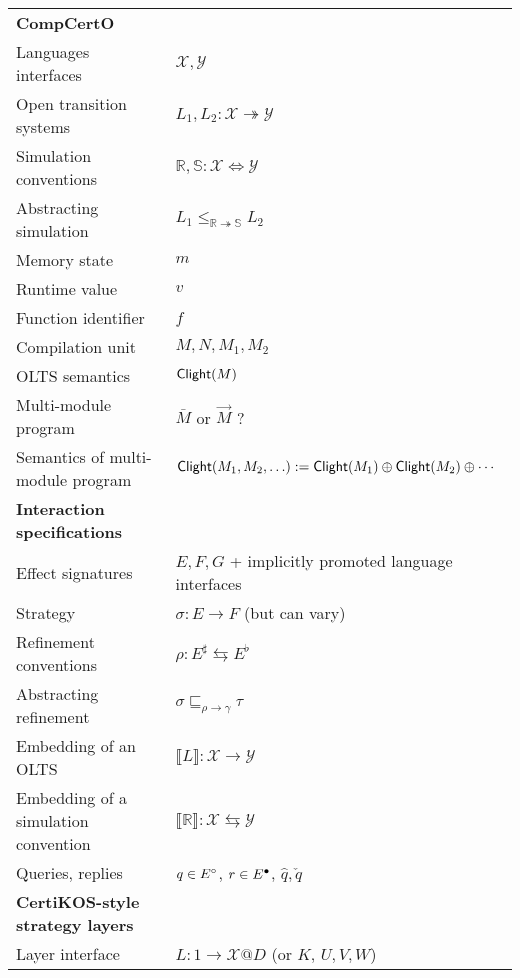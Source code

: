\documentclass[acmsmall,review,anonymous]{acmart}\settopmatter{printfolios=true,printccs=false,printacmref=false}
\begin{document}
\begin{table} %
  \begin{tabular}{ll}
    \hline
    \textbf{CompCertO} \\
    Languages interfaces & $\mathcal{X, Y}$ \\
    Open transition systems &
      $L_1, L_2 : \mathcal{X} \twoheadrightarrow \mathcal{Y}$ \\
    Simulation conventions &
      $\mathbb{R}, \mathbb{S} : \mathcal{X} \Leftrightarrow \mathcal{Y}$ \\
    Abstracting simulation &
      $L_1 \le_{\mathbb{R} \twoheadrightarrow \mathbb{S}} L_2$ \\
    \hline
    Memory state & $m$ \\
    Runtime value & $v$ \\
    Function identifier & $f$ \\
    \hline
    Compilation unit & $M, N, M_1, M_2$ \\
    OLTS semantics & $ \mathsf{Clight} (M)$ \\
    Multi-module program & $\bar{M}$ or $\vec{M}$ ? \\
    Semantics of multi-module program &
      $ \mathsf{Clight} (M_1, M_2, \ldots) :=
        \mathsf{Clight} (M_1) \oplus  \mathsf{Clight} (M_2) \oplus \cdots$ \\
    \hline
    \textbf{Interaction specifications} \\
    Effect signatures &
      $E, F, G$ + implicitly promoted language interfaces \\
    Strategy & $\sigma : E \rightarrow F$ (but can vary) \\
    Refinement conventions & $\rho : E^\sharp \leftrightarrows E^\flat$ \\
    Abstracting refinement &
      $\sigma \sqsubseteq_{\rho \rightarrow \gamma} \tau$ \\
    Embedding of an OLTS &
      $\llbracket L \rrbracket : \mathcal{X} \rightarrow \mathcal{Y}$ \\
    Embedding of a simulation convention &
      $\llbracket \mathbb{R} \rrbracket : \mathcal{X} \leftrightarrows \mathcal{Y}$\\
    Queries, replies & $q \in E^\circ$, $r \in E^\bullet$, $\hat{q}, \check{q}$ \\
    \hline
    \textbf{CertiKOS-style strategy layers} \\
    Layer interface & $L : 1 \rightarrow \mathcal{X}@D$ (or $K$, $U,V,W$) \\

\end{tabular}
\end{table}
\end{document}
